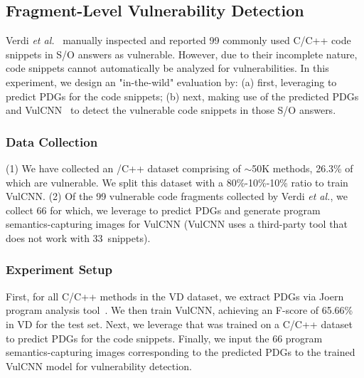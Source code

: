 \subsection{Fragment-Level Vulnerability Detection}
\label{sec:fragment}


Verdi {\em et al.}~\cite{verdi-tse22} manually inspected and reported
99 commonly used C/C++ code snippets in S/O answers as vulnerable.
However, due to their incomplete nature, code snippets cannot
automatically be analyzed for vulnerabilities. In this experiment, we
design an "in-the-wild" evaluation by: (a) first, leveraging \tool to
predict PDGs for the code snippets; (b) next, making use of the
predicted PDGs and VulCNN~\cite{wu2022vulcnn} to detect the vulnerable
code snippets in those S/O answers.



\subsubsection*{\bf Data Collection}
(1) We have collected an /C++ dataset comprising of $\sim$50K methods,
26.3\% of which are vulnerable. We split this dataset with a
80\%-10\%-10\% ratio to train VulCNN. (2) Of the 99 vulnerable code
fragments collected by Verdi {\em et al.}, we collect 66 for which, we
leverage \tool to predict PDGs and generate program
semantics-capturing images for VulCNN (VulCNN uses a third-party tool
that does not work with 33~snippets).

\subsubsection*{\bf Experiment Setup}
First, for all C/C++ methods in the VD dataset, we extract PDGs via
Joern program analysis tool~\cite{joern-2014}. We then train VulCNN,
achieving an F-score of 65.66\% in VD for the test set. Next, we
leverage \tool that was trained on a C/C++ dataset to predict PDGs for
the code snippets. Finally, we input the 66 program
semantics-capturing images corresponding to the predicted PDGs to
the trained VulCNN model for vulnerability detection.

